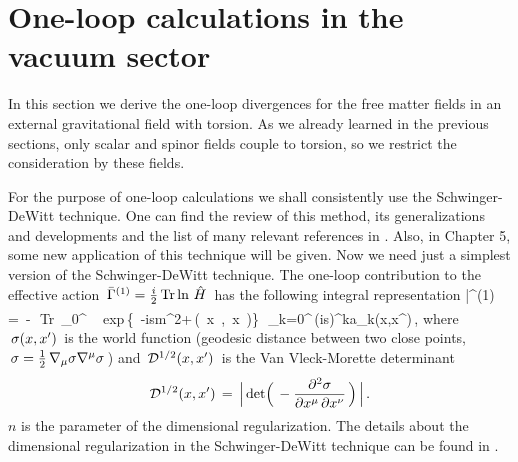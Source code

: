 \section{One-loop calculations in the vacuum sector}

In this section we derive the one-loop 
divergences for the free matter fields in an external 
gravitational field with torsion. As we already learned 
in the previous sections, only scalar and spinor fields 
couple to torsion, so we restrict the 
consideration by these fields.

For the purpose of one-loop calculations we shall consistently 
use the Schwinger-DeWitt technique. One can find the review of 
this method, 
its generalizations and developments and the list of 
many relevant references in \cite{dewitt,bavi,vilk,avram}. 
Also, in Chapter 5, some new application of this technique will 
be given. Now we need just a simplest version of the 
Schwinger-DeWitt technique.
The one-loop contribution to the effective action 
$\,{\bar {\Gamma}}^{(1)} = \frac{i}{2}\,{\rm Tr}\ln\,{\hat H}\,$
has the following integral representation
\beq
{\bar \Ga}^{(1)} \,=\, -\, \,{\rm Tr}\,
\int_0^\infty\,\,\,
\,\,{\rm exp}\,\left\{\,
{-ism^2+\,\si(x,x^\prime)}\right\}
\,\,\sum_{k=0}^{\infty}\,(is)^k{\hat a}_k(x,x^\prime)\,,
\label{a2..}
\eeq	
where $\,\sigma(x,x^\prime)\,$ is the world function (geodesic distance 
between two close points, $\,\sigma=\frac12\,\nabla_\mu\sigma\nabla^\mu\sigma\,$)
and $\,{\cal D}^{1/2}(x,x^\prime)\,$ is the Van Vleck-Morette 
determinant
$$
{\cal D}^{1/2}(x,x^\prime)\,=\,
\Big|\,{\rm det}\Big(\,
-\frac{\partial^2 \sigma}{\partial x^\mu\,\partial x^\nu}\,\Big)\,\Big|\,.
$$
$n$ is the parameter of the dimensional regularization.
The details about the dimensional regularization in the 
Schwinger-DeWitt technique can be found in \cite{bavi}. 

